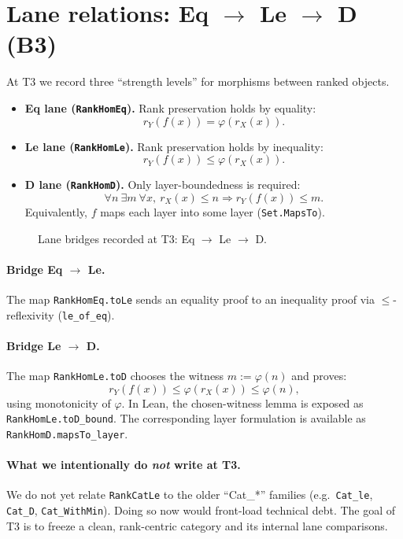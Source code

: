 \section{Lane relations: Eq $\to$ Le $\to$ D (B3)}
\label{sec:t3-lanes}

At T3 we record three ``strength levels'' for morphisms between ranked objects.

\begin{itemize}
\item \textbf{Eq lane (\texttt{RankHomEq}).}
Rank preservation holds by equality:
\[
  r_Y(f(x)) = \varphi(r_X(x)).
\]
\item \textbf{Le lane (\texttt{RankHomLe}).}
Rank preservation holds by inequality:
\[
  r_Y(f(x)) \le \varphi(r_X(x)).
\]
\item \textbf{D lane (\texttt{RankHomD}).}
Only layer-boundedness is required:
\[
  \forall n\ \exists m\ \forall x,\ r_X(x)\le n \Rightarrow r_Y(f(x))\le m.
\]
Equivalently, $f$ maps each layer into some layer (\texttt{Set.MapsTo}).
\end{itemize}

\begin{figure}[h]
\centering
{}
\caption{Lane bridges recorded at T3: Eq $\to$ Le $\to$ D.}
\label{fig:t3-bridges}
\end{figure}

\paragraph{Bridge Eq $\to$ Le.}
The map \texttt{RankHomEq.toLe} sends an equality proof to an inequality proof via $\le$-reflexivity
(\texttt{le\_of\_eq}).

\paragraph{Bridge Le $\to$ D.}
The map \texttt{RankHomLe.toD} chooses the witness $m := \varphi(n)$ and proves:
\[
  r_Y(f(x)) \le \varphi(r_X(x)) \le \varphi(n),
\]
using monotonicity of $\varphi$. In Lean, the chosen-witness lemma is exposed as
\texttt{RankHomLe.toD\_bound}. The corresponding layer formulation is available as
\texttt{RankHomD.mapsTo\_layer}.

\paragraph{What we intentionally do \emph{not} write at T3.}
We do not yet relate \texttt{RankCatLe} to the older ``Cat\_*'' families (e.g.\ \texttt{Cat\_le},
\texttt{Cat\_D}, \texttt{Cat\_WithMin}). Doing so now would front-load technical debt.
The goal of T3 is to freeze a clean, rank-centric category and its internal lane comparisons.
